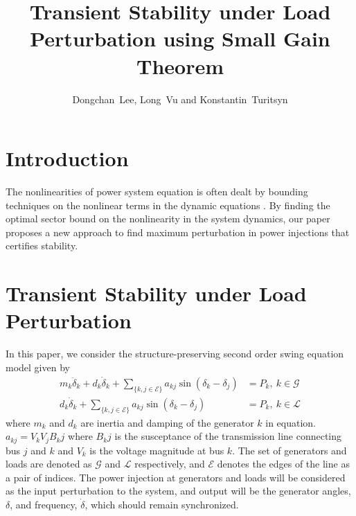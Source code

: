\documentclass[journal]{IEEEtran}
\begin{document}
\title{Transient Stability under Load Perturbation using Small Gain Theorem}
\author{Dongchan~Lee, Long~Vu and Konstantin~Turitsyn}

\maketitle



\IEEEpeerreviewmaketitle


\section{Introduction}
The nonlinearities of power system equation is often dealt by bounding techniques on the nonlinear terms in the dynamic equations \cite{}. 
By finding the optimal sector bound on the nonlinearity in the system dynamics, our paper proposes a new approach to find maximum perturbation in power injections that certifies stability.

\section{Transient Stability under Load Perturbation}
In this paper, we consider the structure-preserving second order swing equation model given by
\begin{equation}
\begin{aligned}
m_k\ddot{\delta}_k+d_k\dot{\delta}_k+\sum_{\{k,j\in\mathcal{E}\}}a_{kj}\sin(\delta_k-\delta_j)&=P_k,\ k\in\mathcal{G} \\
d_k\dot{\delta}_k+\sum_{\{k,j\in\mathcal{E}\}}a_{kj}\sin(\delta_k-\delta_j)&=P_k,\ k\in\mathcal{L}
\end{aligned}
\label{eqn_swing}
\end{equation}
where $m_k$ and $d_k$ are inertia and damping of the generator $k$ in equation.$a_{kj}=V_kV_jB_kj$ where $B_kj$ is the susceptance of the transmission line connecting bus $j$ and $k$ and $V_k$ is the voltage magnitude at bus $k$. The set of generators and loads are denoted as $\mathcal{G}$ and $\mathcal{L}$ respectively, and $\mathcal{E}$ denotes the edges of the line as a pair of indices. The power injection at generators and loads will be considered as the input perturbation to the system, and output will be the generator angles, $\delta$, and frequency, $\dot{\delta}$, which should remain synchronized.
\end{document}
